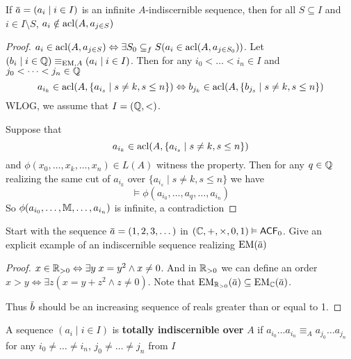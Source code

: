 \documentclass[11pt]{article}
\begin{document}
\begin{lemma}[]
If \(\bara=(a_i\mid i\in I)\) is an infinite \(A\)-indiscernible sequence, then for all \(S\subseteq I\)
and \(i\in I\setminus S\), \(a_i\notin\operatorname{acl}(A,a_{j\in S})\)
\end{lemma}

\begin{proof}
\(a_i\in\operatorname{acl}(A,a_{j\in S})\Leftrightarrow\exists S_0\subseteq_f S(a_i\in\operatorname{acl}(A,a_{j\in S_0}))\). Let \((b_i\mid i\in\mathbb{Q})\equiv_{\operatorname{EM},A}(a_i\mid i\in I)\).
Then for any \(i_0<\dots<i_n\in I\) and \(j_0<\dots<j_n\in\mathbb{Q}\)
\begin{equation*}
a_{i_k}\in\operatorname{acl}(A,\{a_{i_s}\mid s\neq k,s\le n\})\Leftrightarrow b_{j_k}\in\operatorname{acl}(A,\{b_{j_s}\mid s\neq k,s\le n\})
\end{equation*}
WLOG, we assume that \(I=(\mathbb{Q},<)\).

Suppose that
\begin{equation*}
a_{i_k}\in\operatorname{acl}(A,\{a_{i_s}\mid s\neq k,s\le n\})
\end{equation*}
and \(\phi(x_0,\dots,x_k,\dots,x_n)\in L(A)\) witness the property. Then for any \(q\in\mathbb{Q}\) realizing the same
cut of \(a_{i_k}\) over \(\{a_{i_s}\mid s\neq k,s\le n\}\) we have
\begin{equation*}
\vDash\phi(a_{i_0},\dots,a_q,\dots,a_{i_n})
\end{equation*}
So \(\phi(a_{i_0},\dots,\mathbb{M},\dots,a_{i_n})\) is infinite, a contradiction
\end{proof}

\begin{exercise}
\label{Problem1}
Start with the sequence \(\bara=(1,2,3,\dots)\) in \((\mathbb{C},+,\times,0,1)\vDash\textsf{ACF}_0\). Give an explicit example of an
indiscernible sequence realizing \(\EM(\bara)\)
\end{exercise}

\begin{proof}
\(x\in\mathbb{R}_{>0}\Leftrightarrow\exists y\; x=y^2\wedge x\neq 0\). And in \(\mathbb{R}_{>0}\) we can define an
order \(x>y\Leftrightarrow\exists z(x=y+z^2\wedge z\neq 0)\). Note that \(\EM_{\R_{>0}}(\bara)\subseteq\EM_{\C}(\bara)\).

Thus \(\barb\) should be an increasing sequence of reals greater than or equal to 1.
\end{proof}

\begin{definition}[]
A sequence \((a_i\mid i\in I)\) is \textbf{totally indiscernible over} \(A\)
if \(a_{i_0}\dots a_{i_n}\equiv_Aa_{j_0}\dots a_{j_n}\) for any \(i_0\neq\dots\neq i_n\), \(j_0\neq\dots\neq j_n\) from \(I\)
\end{definition}
\end{document}
